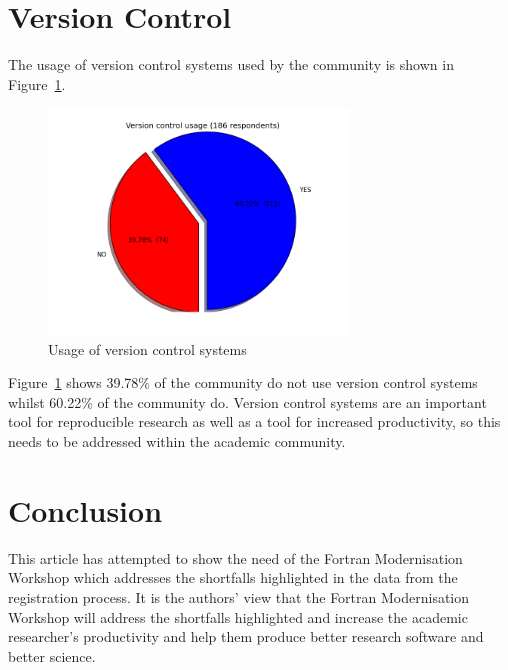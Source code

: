 \documentclass[12pt]{article}
\begin{document}
\section{Version Control}\label{vc}
The usage of version control systems used by the community is shown in 
Figure~\ref{verscon:png}.
\begin{figure}[H]
\begin{center}
\includegraphics[width=8cm,height=6cm]{verscon.png}
\caption{Usage of version control systems}\label{verscon:png}
\end{center}
\end{figure}
Figure~\ref{verscon:png} shows 39.78\% of the community do not use version control systems
whilst 60.22\% of the community do. Version control systems are an important
tool for reproducible research as well as a tool for increased productivity, so
this needs to be addressed within the academic community. 
%
\section{Conclusion}
This article has attempted to show the need of the Fortran Modernisation Workshop
which addresses the shortfalls highlighted in the data from the registration process. 
It is the authors' view that the Fortran Modernisation Workshop will address the
shortfalls highlighted and increase the academic researcher's productivity and help them
produce better research software and better science. 


\end{document}
